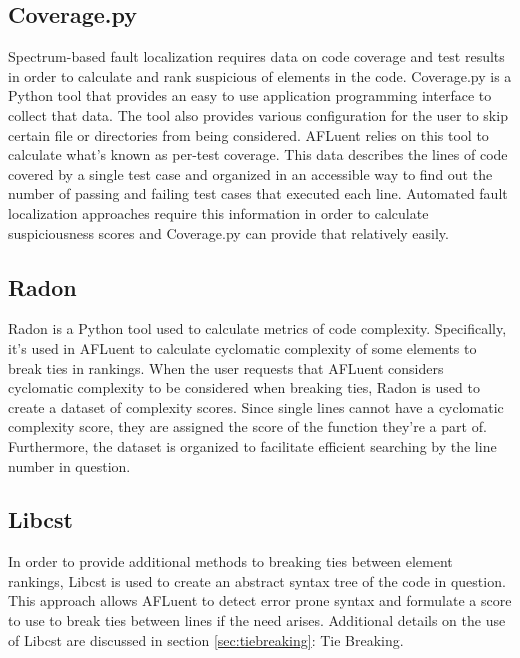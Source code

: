 \subsection{Coverage.py}
\label{subsec:coverage}

Spectrum-based fault localization requires data on code coverage and test
results in order to calculate and rank suspicious of elements in the code.
Coverage.py\cite{coverage_py_website} is a Python tool that provides an easy to use application
programming interface to collect that data. The tool also provides various
configuration for the user to skip certain file or directories from being
considered. AFLuent relies on this tool to calculate what's known as per-test
coverage. This data describes the lines of code covered by a single test case
and organized in an accessible way to find out the number of passing and failing
test cases that executed each line. Automated fault localization approaches
require this information in order to calculate suspiciousness scores and
Coverage.py can provide that relatively easily.

\subsection{Radon}
\label{subsec:radon}

Radon is a Python tool used to calculate metrics of code complexity.
Specifically, it's used in AFLuent to calculate cyclomatic complexity of some
elements to break ties in rankings. When the user requests that AFLuent
considers cyclomatic complexity to be considered when breaking ties, Radon is
used to create a dataset of complexity scores. Since single lines cannot have a
cyclomatic complexity score, they are assigned the score of the function they're
a part of. Furthermore, the dataset is organized to facilitate efficient
searching by the line number in question.

\subsection{Libcst}
\label{subsec:libcst}

In order to provide additional methods to breaking ties between element
rankings, Libcst is used to create an abstract syntax tree of the code in
question. This approach allows AFLuent to detect error prone syntax and
formulate a score to use to break ties between lines if the need arises.
Additional details on the use of Libcst are discussed in section
\ref{sec:tiebreaking}: Tie Breaking.

